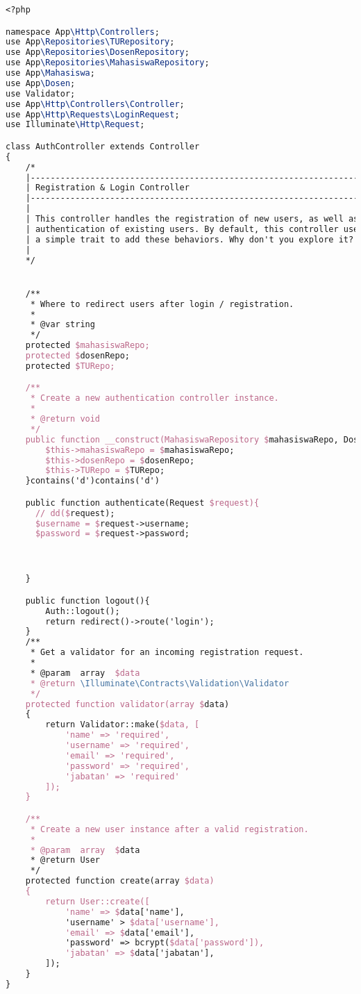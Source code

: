 \begin{lstlisting}[language=tex,basicstyle=\tiny,caption=FormatsuratController.php]
<?php

namespace App\Http\Controllers;
use App\Repositories\TURepository;
use App\Repositories\DosenRepository;
use App\Repositories\MahasiswaRepository;
use App\Mahasiswa;
use App\Dosen;
use Validator;
use App\Http\Controllers\Controller;
use App\Http\Requests\LoginRequest;
use Illuminate\Http\Request;

class AuthController extends Controller
{
    /*
    |--------------------------------------------------------------------------
    | Registration & Login Controller
    |--------------------------------------------------------------------------
    |
    | This controller handles the registration of new users, as well as the
    | authentication of existing users. By default, this controller uses
    | a simple trait to add these behaviors. Why don't you explore it?
    |
    */


    /**
     * Where to redirect users after login / registration.
     *
     * @var string
     */
    protected $mahasiswaRepo;
    protected $dosenRepo;
    protected $TURepo;

    /**
     * Create a new authentication controller instance.
     *
     * @return void
     */
    public function __construct(MahasiswaRepository $mahasiswaRepo, DosenRepository $dosenRepo, TURepository $TURepo){
        $this->mahasiswaRepo = $mahasiswaRepo;
        $this->dosenRepo = $dosenRepo;
        $this->TURepo = $TURepo;
    }contains('d')contains('d')

    public function authenticate(Request $request){
      // dd($request);
      $username = $request->username;
      $password = $request->password;



    }

    public function logout(){
        Auth::logout();
        return redirect()->route('login');
    }
    /**
     * Get a validator for an incoming registration request.
     *
     * @param  array  $data
     * @return \Illuminate\Contracts\Validation\Validator
     */
    protected function validator(array $data)
    {
        return Validator::make($data, [
            'name' => 'required',
            'username' => 'required',
            'email' => 'required',
            'password' => 'required',
            'jabatan' => 'required'
        ]);
    }

    /**
     * Create a new user instance after a valid registration.
     *
     * @param  array  $data
     * @return User
     */
    protected function create(array $data)
    {
        return User::create([
            'name' => $data['name'],
            'username' > $data['username'],
            'email' => $data['email'],
            'password' => bcrypt($data['password']),
            'jabatan' => $data['jabatan'],
        ]);
    }
}

\end{lstlisting}